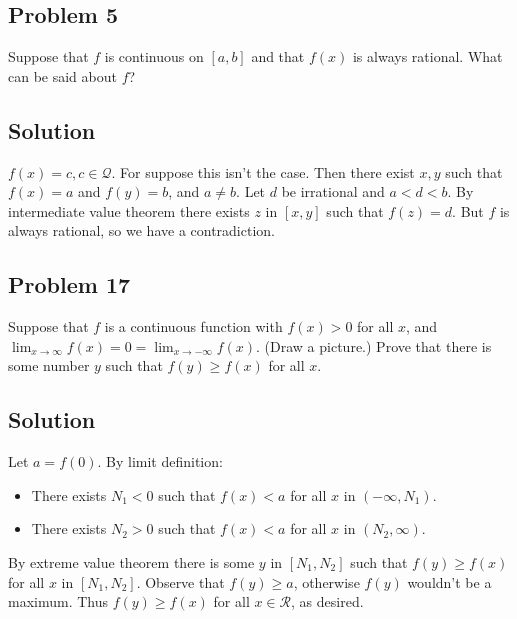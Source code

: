 \subsection*{Problem 5}
Suppose that $f$ is continuous on $[a,b]$ and that $f(x)$ is always
rational. What can be said about $f$?

\subsection*{Solution}
$f(x)=c, c\in\mathcal{Q}$. For suppose this isn't the case. Then there exist
$x,y$ such that $f(x)=a$ and $f(y)=b$, and $a\neq b$. Let $d$ be
irrational and $a<d<b$. By intermediate value theorem there exists $z$
in $[x, y]$ such that $f(z)=d$. But $f$ is always rational, so we have
a contradiction.

\subsection*{Problem 17}
Suppose that $f$ is a continuous function with $f(x)>0$ for all $x$,
and $\lim_{x\to\infty} f(x)=0=\lim_{x\to-\infty} f(x)$. (Draw a picture.) Prove that
there is some number $y$ such that $f(y)\geq f(x)$ for all $x$.

\subsection*{Solution}
Let $a=f(0)$. By limit definition:
\begin{itemize}
\item There exists $N_1<0$ such that $f(x)<a$ for all $x$ in $(-\infty, N_1)$.
\item There exists $N_2>0$ such that $f(x)<a$ for all $x$ in $(N_2, \infty)$.
\end{itemize}

By extreme value theorem there is some $y$ in $[N_1, N_2]$ such that
$f(y)\geq f(x)$ for all $x$ in $[N_1, N_2]$. Observe that $f(y)\geq a$,
otherwise $f(y)$ wouldn't be a maximum. Thus $f(y)\ge f(x)$ for all
$x\in\mathcal{R}$, as desired.


